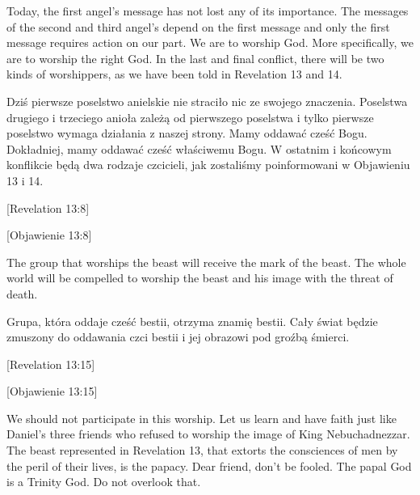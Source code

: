 Today, the first angel’s message has not lost any of its importance. The messages of the second and third angel’s depend on the first message and only the first message requires action on our part. We are to worship God. More specifically, we are to worship the right God. In the last and final conflict, there will be two kinds of worshippers, as we have been told in Revelation 13 and 14.


Dziś pierwsze poselstwo anielskie nie straciło nic ze swojego znaczenia. Poselstwa drugiego i trzeciego anioła zależą od pierwszego poselstwa i tylko pierwsze poselstwo wymaga działania z naszej strony. Mamy oddawać cześć Bogu. Dokładniej, mamy oddawać cześć właściwemu Bogu. W ostatnim i końcowym konflikcie będą dwa rodzaje czcicieli, jak zostaliśmy poinformowani w Objawieniu 13 i 14.


[Revelation 13:8]


[Objawienie 13:8]


The group that worships the beast will receive the mark of the beast. The whole world will be compelled to worship the beast and his image with the threat of death.


Grupa, która oddaje cześć bestii, otrzyma znamię bestii. Cały świat będzie zmuszony do oddawania czci bestii i jej obrazowi pod groźbą śmierci.


[Revelation 13:15]


[Objawienie 13:15]


We should not participate in this worship. Let us learn and have faith just like Daniel’s three friends who refused to worship the image of King Nebuchadnezzar. The beast represented in Revelation 13, that extorts the consciences of men by the peril of their lives, is the papacy. Dear friend, don't be fooled. The papal God is a Trinity God. Do not overlook that.



